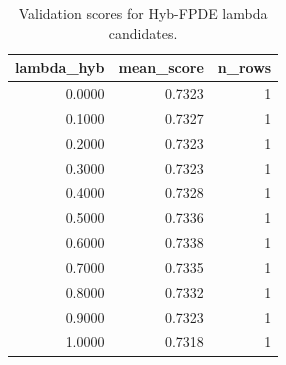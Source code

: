 \begin{table}[t]
\caption{Validation scores for Hyb-FPDE lambda candidates.}
\label{tab:lambda_distribution_computed}
\centering
\begin{tabular}{rrr}
\toprule
lambda\_hyb & mean\_score & n\_rows \\
\midrule
0.0000 & 0.7323 & 1 \\
0.1000 & 0.7327 & 1 \\
0.2000 & 0.7323 & 1 \\
0.3000 & 0.7323 & 1 \\
0.4000 & 0.7328 & 1 \\
0.5000 & 0.7336 & 1 \\
0.6000 & 0.7338 & 1 \\
0.7000 & 0.7335 & 1 \\
0.8000 & 0.7332 & 1 \\
0.9000 & 0.7323 & 1 \\
1.0000 & 0.7318 & 1 \\
\bottomrule
\end{tabular}

\end{table}
